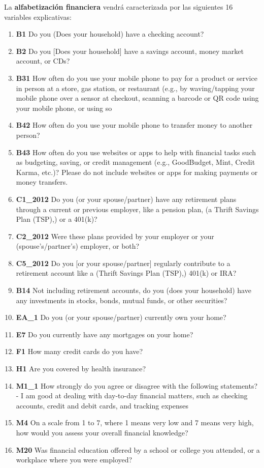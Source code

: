 \documentclass[a4paper, 11pt]{article}
\begin{document}
La \textbf{alfabetización financiera} vendrá caracterizada por las siguientes 16 variables explicativas:
\begin{enumerate}
    \item \textbf{B1} Do you (Does your household) have a checking account? 
    \item \textbf{B2} Do you [Does your household] have a savings account, money market account, or CDs?
    \item \textbf{B31} How often do you use your mobile phone to pay for a product or service in person at a store,
    gas station, or restaurant (e.g., by waving/tapping your mobile phone over a sensor at checkout, scanning
    a barcode or QR code using your mobile phone, or using so 
    \item \textbf{B42} How often do you use your mobile phone to transfer money to another person?
    \item \textbf{B43} How often do you use websites or apps to help with financial tasks such as budgeting, saving,
    or credit management (e.g., GoodBudget, Mint, Credit Karma, etc.)? Please do not include websites or 
    apps for making payments or money transfers.
    \item \textbf{C1\_2012} Do you (or your spouse/partner) have any retirement plans through a current or previous 
    employer, like a pension plan, (a Thrift Savings Plan (TSP),) or a 401(k)?
    \item \textbf{C2\_2012} Were these plans provided by your employer or your (spouse's/partner's) employer, or both? 
    \item \textbf{C5\_2012} Do you [or your spouse/partner] regularly contribute to a retirement account like a (Thrift
    Savings Plan (TSP),) 401(k) or IRA?   
    \item \textbf{B14} Not including retirement accounts, do you  (does your household) have any investments in stocks, bonds, mutual funds, or other securities? 
    \item \textbf{EA\_1}  Do you (or your spouse/partner) currently own your home?
    \item \textbf{E7} Do you currently have any mortgages on your home?
    \item \textbf{F1} How many credit cards do you have?  
    \item \textbf{H1}  Are you covered by health insurance?
    \item \textbf{M1\_1} How strongly do you agree or disagree with the following statements? - I am good at dealing with day-to-day financial matters, such as checking accounts, credit and debit cards, and tracking expenses
    \item \textbf{M4} On a scale from 1 to 7, where 1 means very low and 7 means very high, how would you assess your overall financial knowledge?
    \item \textbf{M20} Was financial education offered by a school or college you attended, or a workplace where you were employed?
\end{enumerate}
\end{document}
